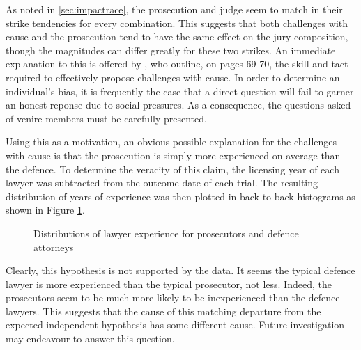 As noted in \ref{sec:impactrace}, the prosecution and judge seem to match in their strike tendencies for every combination. This
suggests that both challenges with cause and the prosecution tend to have the same effect on the jury composition, though the
magnitudes can differ greatly for these two strikes. An immediate explanation to this is offered by \cite{hansvidjudging}, who
outline, on pages 69-70, the skill and tact required to effectively propose challenges with cause. In order to determine an
individual's bias, it is frequently the case that a direct question will fail to garner an honest reponse due to social pressures.
As a consequence, the questions asked of venire members must be carefully presented.

Using this as a motivation, an obvious possible explanation for the challenges with cause is that the prosecution is simply more
experienced on average than the defence. To determine the veracity of this claim, the licensing year of each lawyer was subtracted
from the outcome date of each trial. The resulting distribution of years of experience was then plotted in back-to-back histograms
as shown in Figure \ref{fig:lawyerexp}.

\begin{figure}[h!]
  \caption[Lawyer Experience (Sunshine)]
  {\footnotesize Distributions of lawyer experience for prosecutors and defence attorneys}
  \label{fig:lawyerexp}
\end{figure}

Clearly, this hypothesis is not supported by the data. It seems the typical defence lawyer is more experienced than the typical
prosecutor, not less. Indeed, the prosecutors seem to be much more likely to be inexperienced than the defence lawyers. This
suggests that the cause of this matching departure from the expected independent hypothesis has some different cause. Future
investigation may endeavour to answer this question.

